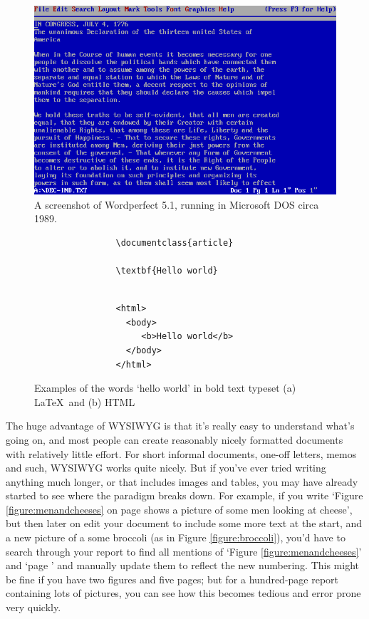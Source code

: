 \begin{refsection}
\begin{figure}
\centerline{\includegraphics[width=12cm]{images/wordperfect.png}}
\caption{A screenshot of Wordperfect 5.1, running in Microsoft DOS circa 1989.}\label{figure:wordperfect}
\end{figure}

\begin{figure}

\begin{verbatim}
                \documentclass{article}
                
                \textbf{Hello world}
                
\end{verbatim}
\begin{verbatim}
                <html>
                  <body>
                     <b>Hello world</b>
                  </body>
                </html>
\end{verbatim}

\caption{Examples of the words `hello world' in bold text typeset (a) \LaTeX\ and (b) HTML}\label{figure:helloworld}
\end{figure}


The huge advantage of WYSIWYG is that it's really easy to understand what's going on, and most people can create reasonably nicely formatted documents with relatively little effort. For short informal documents, one-off letters, memos and such, WYSIWYG works quite nicely. But if you've ever tried writing anything much longer, or that includes images and tables, you may have already started to see where the paradigm breaks down. For example, if you write `Figure \ref{figure:menandcheeses} on page \pageref{figure:menandcheeses}  shows a picture of some men looking at cheese', but then later on edit your document to include some more text at the start, and a new picture of a some broccoli (as in Figure \ref{figure:broccoli}), you'd have to search through your report to find all mentions of `Figure \ref{figure:menandcheeses}' and `page \pageref{figure:menandcheeses}' and manually update them to reflect the new numbering. This might be fine if you have two figures and five pages; but for a hundred-page report containing lots of pictures, you can see how this becomes tedious and error prone very quickly. 


\end{refsection}
